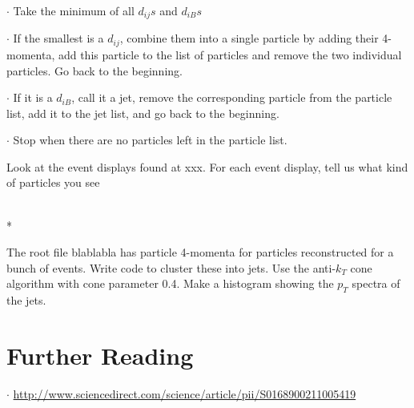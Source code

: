 \noindent
$\cdot$ Take the minimum of all $d_{ij}s$ and $d_{iB}s$

\noindent
$\cdot$ If the smallest is a $d_{ij}$, combine them into a single particle by adding their 4-momenta, add this particle to the list of particles and remove the two individual particles.  Go back to the beginning.

\noindent 
$\cdot$ If it is a $d_{iB}$, call it a jet, remove the corresponding particle from the particle list, add it to the jet list, and go back to the beginning.

\noindent
$\cdot$ Stop when there are no particles left in the particle list.
\newpage
\noindent
\vspace{.2cm} 
\begin{minipage}{0.7\textwidth} 
\begin{framed}
\begin{exercise}
{Look at the event displays found at xxx. For each event display, tell us what kind of particles you see}
\end{exercise}
\end{framed} 
\end{minipage}
\vspace{.2cm}
\\*
\vspace{.2cm} 
\begin{minipage}{0.7\textwidth} 
\begin{framed}
\begin{exercise}
{The root file blablabla has particle 4-momenta for particles reconstructed for a bunch of events. Write code to cluster these into jets. Use the anti-$k_{T}$ cone algorithm with cone parameter 0.4. Make a histogram showing the $p_{T}$ spectra of the jets.}
\end{exercise}
\end{framed} 
\end{minipage}
\vspace{.2cm}

\section{Further Reading}
\noindent
$\cdot$ \url{http://www.sciencedirect.com/science/article/pii/S0168900211005419}

